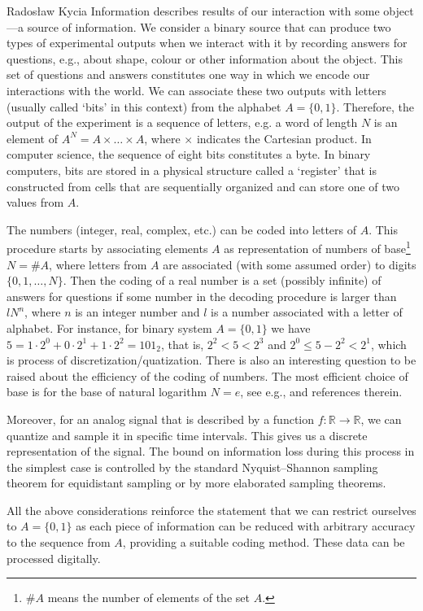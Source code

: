 \begin{artengenv}{Radosław Kycia}
Information describes results of our interaction with some object---a source of information. We consider a binary source that can produce two types of experimental outputs when we interact with it by recording answers for questions, e.g., about shape, colour or other information about the object. This set of questions and answers constitutes one way in which we encode our interactions with the world. We can associate these two outputs with letters (usually called `bits' in this context) from the alphabet $A=\{0,1\}$. Therefore, the output of the experiment is a sequence of letters, e.g. a word of length $N$ is an element of $A^N=A\times \ldots \times A$, where $\times$ indicates the Cartesian product. In computer science, the sequence of eight bits constitutes a byte. In binary computers, bits are stored in a physical structure called a `register' that is constructed from cells that are sequentially organized and can store one of two values from $A$. 

The numbers (integer, real, complex, etc.) can be coded into letters of $A$. This procedure starts by associating elements $A$ as representation of numbers of base\footnote{$\#A$ means the number of elements of the set $A$.} $N=\#A$, where letters from $A$ are associated (with some assumed order) to digits $\{0,1,\ldots, N\}$. Then the coding of a real number is a set (possibly infinite) of answers for questions if some number in the decoding procedure is larger than $lN^{n}$, where $n$ is an integer number and $l$ is a number associated with a letter of alphabet. For instance, for binary system $A=\{0,1\}$ we have  $5 = 1\cdot2^{0}+0\cdot 2^{1} + 1\cdot 2^{2} = 101_{2}$, that is, $2^{2} < 5 <2^{3}$ and $ 2^{0} \leq 5-2^{2} < 2^{1}$, which is process of discretization/quatization. There is also an interesting question to be raised about the efficiency of the coding of numbers. The most efficient choice of base is for the base of natural logarithm  $N=e$, see e.g., \parencite{KyciaNiemczynowicz} and references therein.

Moreover, for an analog signal that is described by a function $f:\mathbb{R}\rightarrow \mathbb{R}$, we can quantize and sample it in specific time intervals. This gives us a discrete representation of the signal. The bound on information loss during this process in the simplest case is controlled by the standard Nyquist--Shannon sampling theorem for equidistant sampling \parencite{Probing, RezaInformation} or by more elaborated sampling theorems.

All the above considerations reinforce the statement that we can restrict ourselves to  $A=\{0,1\}$ as each piece of information can be reduced with arbitrary accuracy to the sequence from $A$, providing a suitable coding method. These data can be processed digitally.


\end{artengenv}
